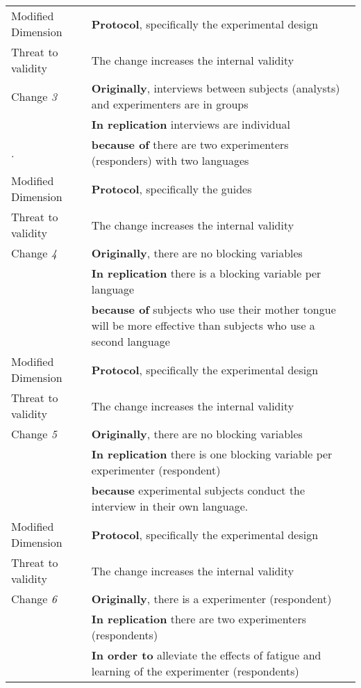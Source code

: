 \begin{table*}[h]
\begin{tabularx}{\textwidth}{
  >{\hsize=0.3\hsize}X
  >{\hsize=0.8\hsize}X}
    Modified Dimension & 
   \textbf{Protocol}, specifically the experimental design  \\ 
    Threat to validity & The change increases the internal validity \\  \hline
    
 
     Change \textit{3}   & \textbf{Originally}, interviews between subjects (analysts) and experimenters are in groups \\& \textbf{In replication} interviews are individual  \\.  
    & \textbf{because of} there are two experimenters (responders) with two languages \\ 

    Modified Dimension & 
    \textbf{Protocol}, specifically the guides \\   
    Threat to validity & The change increases the internal validity  \\  \hline

    Change \textit{4}   & \textbf{Originally}, there are no blocking variables \\& \textbf{In replication} there is a blocking variable per language \\& \textbf{because of} subjects who use their mother tongue will be more effective than subjects who use a second language  \\ 

     Modified Dimension & 
   \textbf{Protocol}, specifically the experimental design  \\ 
    Threat to validity & The change increases the internal validity \\  \hline
    
    Change \textit{5}   & \textbf{Originally}, there are no blocking variables \\& \textbf{In replication} there is one blocking variable per experimenter (respondent) \\& \textbf{because} experimental subjects conduct the interview in their own language.  \\ 

     Modified Dimension & 
   \textbf{Protocol}, specifically the experimental design  \\ 
    Threat to validity & The change increases the internal validity \\  \hline
    
    Change \textit{6}   & \textbf{Originally}, there is a experimenter (respondent) \\& \textbf{In replication} there are two experimenters (respondents) \\& \textbf{In order to} alleviate the effects of fatigue and learning of the experimenter (respondents)  \\ 


\end{tabularx}
\end{table*}
